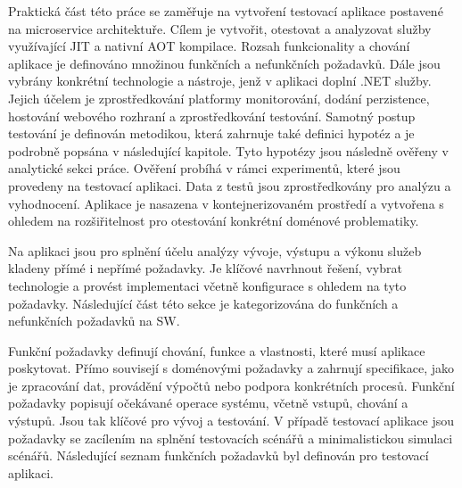 

Praktická část této práce se zaměřuje na vytvoření testovací aplikace postavené na microservice architektuře. Cílem je vytvořit, otestovat a analyzovat služby využívající JIT a nativní AOT kompilace. Rozsah funkcionality a chování aplikace je definováno množinou funkčních a nefunkčních požadavků. Dále jsou vybrány konkrétní technologie a nástroje, jenž v aplikaci doplní .NET služby. Jejich účelem je zprostředkování platformy monitorování, dodání perzistence, hostování webového rozhraní a zprostředkování testování. Samotný postup testování je definován metodikou, která zahrnuje také definici hypotéz a je podrobně popsána v následující kapitole. Tyto hypotézy jsou následně ověřeny v analytické sekci práce. Ověření probíhá v rámci experimentů, které jsou provedeny na testovací aplikaci. Data z testů jsou zprostředkovány pro analýzu a vyhodnocení. Aplikace je nasazena v kontejnerizovaném prostředí a vytvořena s ohledem na rozšiřitelnost pro otestování konkrétní doménové problematiky.


Na aplikaci jsou pro splnění účelu analýzy vývoje, výstupu a výkonu služeb kladeny přímé i nepřímé požadavky. Je klíčové navrhnout řešení, vybrat technologie a provést implementaci včetně konfigurace s ohledem na tyto požadavky. Následující část této sekce je kategorizována do funkčních a nefunkčních požadavků na SW.


Funkční požadavky definují chování, funkce a vlastnosti, které musí aplikace poskytovat. Přímo souvisejí s doménovými požadavky a zahrnují specifikace, jako je zpracování dat, provádění výpočtů nebo podpora konkrétních procesů. Funkční požadavky popisují očekávané operace systému, včetně vstupů, chování a výstupů. Jsou tak klíčové pro vývoj a testování. V případě testovací aplikace jsou požadavky se zacílením na splnění testovacích scénářů a minimalistickou simulaci scénářů. Následující seznam funkčních požadavků byl definován pro testovací aplikaci.


